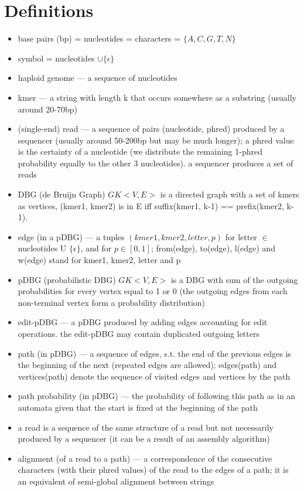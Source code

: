 \section{Definitions}
\begin{itemize}
	\item base pairs (bp) = nucleotides = characters = $\{A, C, G, T, N\}$ 
	\item symbol = nucleotides $\cup \{\epsilon\}$ 
	\item haploid genome --- a sequence of nucleotides
	\item kmer --- a string with length k that occurs somewhere as a substring (usually around 20-70bp)
	\item (single-end) read --- a sequence of pairs (nucleotide, phred) produced by a sequencer (usually around 50-200bp but may be much longer); a phred value is the certainty of a nucleotide (we distribute the remaining 1-phred probability equally to the other 3 nucleotides). a sequencer produces a set of reads
	\item DBG (de Bruijn Graph) $GK<V, E>$ is a directed graph with a set of kmers as vertices, (kmer1, kmer2) is in E iff suffix(kmer1, k-1) == prefix(kmer2, k-1).
	\item edge (in a pDBG) --- a tuples $(kmer1, kmer2, letter, p)$ for letter $\in$ nucleotides U $\{\epsilon\}$, and for $p \in [0,1]$; from(edge), to(edge), l(edge) and w(edge) stand for kmer1, kmer2, letter and p
	\item pDBG (probabilistic DBG) $GK<V, E>$ is a DBG with sum of the outgoing probabilities for every vertex equal to 1 or 0 (the outgoing edges from each non-terminal vertex form a probability distribution)
	\item edit-pDBG --- a pDBG produced by adding edges accounting for edit operations. the edit-pDBG may contain duplicated outgoing letters
	\item path (in pDBG) --- a sequence of edges, s.t. the end of the previous edges is the beginning of the next (repeated edges are allowed); edges(path) and vertices(path) denote the sequence of visited edges and vertices by the path
	\item path probability (in pDBG) --- the probability of following this path as in an automata given that the start is fixed at the beginning of the path
	\item a read is a sequence of the same structure of a read but not necessarily produced by a sequencer (it can be a result of an assembly algorithm)
	\item alignment (of a read to a path) --- a correspondence of the consecutive characters (with their phred values) of the read to the edges of a path; it is an equivalent of semi-global alignment between strings

\end{itemize}
